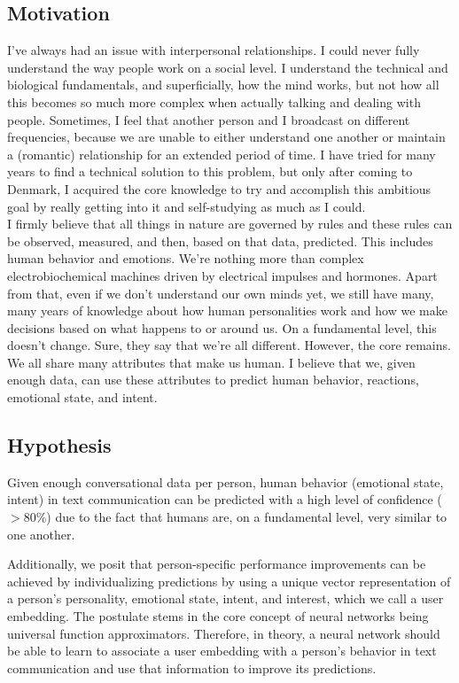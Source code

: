 \documentclass{article}
\begin{document}
\subsection{Motivation}
I've always had an issue with interpersonal relationships. I could never fully understand the way people work on a social level. I understand the technical and biological fundamentals, and superficially, how the mind works, but not how all this becomes so much more complex when actually talking and dealing with people. Sometimes, I feel that another person and I broadcast on different frequencies, because we are unable to either understand one another or maintain a (romantic) relationship for an extended period of time. I have tried for many years to find a technical solution to this problem, but only after coming to Denmark, I acquired the core knowledge to try and accomplish this ambitious goal by really getting into it and self-studying as much as I could.\\
I firmly believe that all things in nature are governed by rules and these rules can be observed, measured, and then, based on that data, predicted. This includes human behavior and emotions. We’re nothing more than complex electrobiochemical machines driven by electrical impulses and hormones. Apart from that, even if we don’t understand our own minds yet, we still have many, many years of knowledge about how human personalities work and how we make decisions based on what happens to or around us. On a fundamental level, this doesn’t change. Sure, they say that we’re all different. However, the core remains. We all share many attributes that make us human. I believe that we, given enough data, can use these attributes to predict human behavior, reactions, emotional state, and intent.

\subsection{Hypothesis}
Given enough conversational data per person, human behavior (emotional state, intent) in text communication can be predicted with a high level of confidence ($>80\%$) due to the fact that humans are, on a fundamental level, very similar to one another.

Additionally, we posit that person-specific performance improvements can be achieved by individualizing predictions by using a unique vector representation of a person's personality, emotional state, intent, and interest, which we call a user embedding. The postulate stems in the core concept of neural networks being universal function approximators. Therefore, in theory, a neural network should be able to learn to associate a user embedding with a person's behavior in text communication and use that information to improve its predictions.
\end{document}
